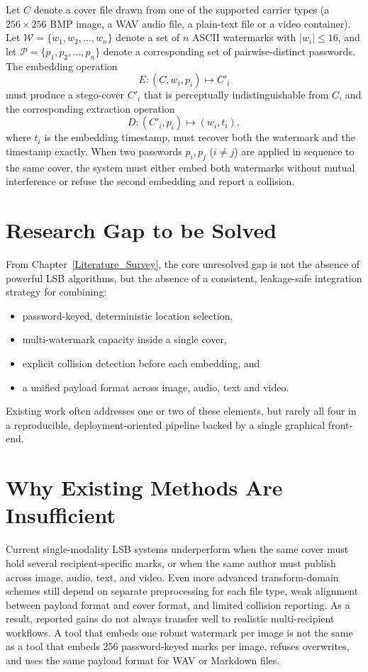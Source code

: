 Let $C$ denote a cover file drawn from one of the supported carrier types (a $256 \times 256$ BMP image, a WAV audio file, a plain-text file or a video container). Let $\mathcal{W} = \{w_1, w_2, \ldots, w_n\}$ denote a set of $n$ ASCII watermarks with $|w_i| \le 16$, and let $\mathcal{P} = \{p_1, p_2, \ldots, p_n\}$ denote a corresponding set of pairwise-distinct passwords. The embedding operation
\[
    E : (C, w_i, p_i) \longmapsto C'_i
\]
must produce a stego-cover $C'_i$ that is perceptually indistinguishable from $C$, and the corresponding extraction operation
\[
    D : (C'_i, p_i) \longmapsto (w_i, t_i),
\]
where $t_i$ is the embedding timestamp, must recover both the watermark and the timestamp exactly. When two passwords $p_i, p_j$ ($i \ne j$) are applied in sequence to the same cover, the system must either embed both watermarks without mutual interference or refuse the second embedding and report a collision.

\section{Research Gap to be Solved}

From Chapter~\ref{Literature_Survey}, the core unresolved gap is not the absence of powerful LSB algorithms, but the absence of a consistent, leakage-safe integration strategy for combining:

\begin{itemize}
    \item password-keyed, deterministic location selection,
    \item multi-watermark capacity inside a single cover,
    \item explicit collision detection before each embedding, and
    \item a unified payload format across image, audio, text and video.
\end{itemize}

Existing work often addresses one or two of these elements, but rarely all four in a reproducible, deployment-oriented pipeline backed by a single graphical front-end.

\section{Why Existing Methods Are Insufficient}

Current single-modality LSB systems underperform when the same cover must hold several recipient-specific marks, or when the same author must publish across image, audio, text, and video. Even more advanced transform-domain schemes still depend on separate preprocessing for each file type, weak alignment between payload format and cover format, and limited collision reporting. As a result, reported gains do not always transfer well to realistic multi-recipient workflows. A tool that embeds one robust watermark per image is not the same as a tool that embeds 256 password-keyed marks per image, refuses overwrites, and uses the same payload format for WAV or Markdown files.

